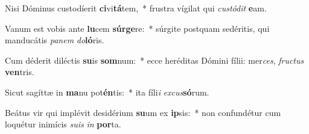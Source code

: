 \item Nisi Dóminus custodíerit \textbf{ci}vi\textbf{tá}tem,~* frustra vígilat qui \textit{cus}\textit{tó}\textit{dit} \textbf{e}am.
\item Vanum est vobis ante \textbf{lu}cem \textbf{súr}\textbf{ge}re:~* súrgite postquam sedéritis, qui manducátis \textit{pa}\textit{nem} \textit{do}\textbf{ló}ris.
\item Cum déderit diléctis \textbf{su}is \textbf{som}num:~* ecce heréditas Dómini fílii: mer\textit{ces}, \textit{fruc}\textit{tus} \textbf{ven}tris.
\item Sicut sagíttæ in \textbf{ma}nu pot\textbf{én}tis:~* ita fíli\textit{i} \textit{ex}\textit{cus}\textbf{só}rum.
\item Beátus vir qui implévit desidérium \textbf{su}um ex \textbf{ip}sis:~* non confundétur cum loquétur inimícis \textit{su}\textit{is} \textit{in} \textbf{por}ta.
